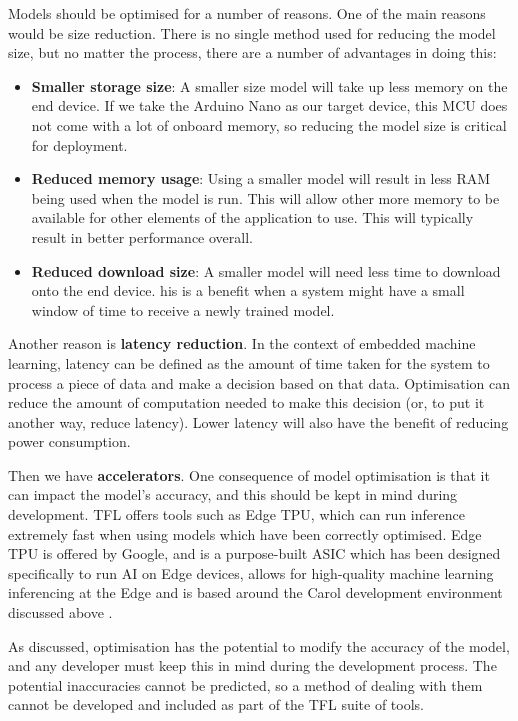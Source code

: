 \documentclass{svproc}
\begin{document}
Models should be optimised for a number of reasons. One of the main reasons would be size reduction. There is no single method used for reducing 
the model size, but no matter the process, there are a number of advantages in doing this:

\begin{itemize}
    \item \textbf{Smaller storage size}: A smaller size model will take up less memory on the end device. If we take the Arduino Nano as our target device, 
    this MCU does not come with a lot of onboard memory, so reducing the model size is critical for deployment.
    \item \textbf{Reduced memory usage}: Using a smaller model will result in less RAM being used when the model is run. 
    This will allow other more memory to be available for other elements of the application to use. This will typically result in better performance overall.
    \item \textbf{Reduced download size}: A smaller model will need less time to download onto the end device. 
    his is a benefit when a system might have a small window of time to receive a newly trained model.
\end{itemize}

Another reason is \textbf{latency reduction}. In the context of embedded machine learning, latency can be defined as the amount of time taken for 
the system to process a piece of data and make a decision based on that data. Optimisation can reduce the amount of computation needed to make 
this decision (or, to put it another way, reduce latency). Lower latency will also have the benefit of reducing power consumption.

Then we have \textbf{accelerators}. One consequence of model optimisation is that it can impact the model's accuracy, and this should be 
kept in mind during development. TFL offers tools such as Edge TPU, which can run inference extremely fast when using models which have 
been correctly optimised. Edge TPU is offered by Google, and is a purpose-built ASIC which has been designed specifically to run AI on Edge 
devices, allows for high-quality machine learning inferencing at the Edge and is based around the Carol development environment discussed 
above \cite{b14}.

As discussed, optimisation has the potential to modify the accuracy of the model, and any developer must keep this in mind during the 
development process. The potential inaccuracies cannot be predicted, so a method of dealing with them cannot be developed and included 
as part of the TFL suite of tools.
\end{document}
